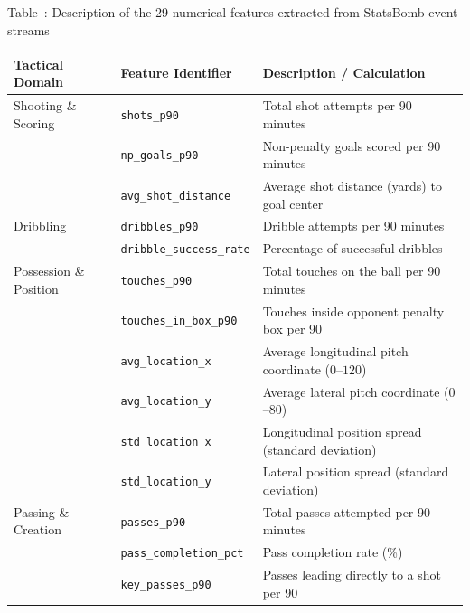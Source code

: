 \documentclass[12pt]{ai_conquer2026}
\begin{document}
\begin{table}[H]
\centering
\begin{minipage}{1.0\linewidth}
  \begin{captionbelowboxaivn}
    Table~\thetable: Description of the 29 numerical features extracted from StatsBomb event streams
    \label{tab:features}
  \end{captionbelowboxaivn}
  \renewcommand{\arraystretch}{1.2}
  \begin{tabularx}{\linewidth}{@{}>{\raggedright\arraybackslash}p{3.5cm} >{\raggedright\arraybackslash}p{5.5cm} >{\raggedright\arraybackslash}X@{}}
    \toprule
    \textbf{Tactical Domain} & \textbf{Feature Identifier} & \textbf{Description / Calculation} \\
    \midrule
    Shooting \& Scoring & \texttt{shots\_p90} & Total shot attempts per 90 minutes \\
     & \texttt{np\_goals\_p90} & Non-penalty goals scored per 90 minutes \\
     & \texttt{avg\_shot\_distance} & Average shot distance (yards) to goal center \\
    \midrule
    Dribbling & \texttt{dribbles\_p90} & Dribble attempts per 90 minutes \\
     & \texttt{dribble\_\allowbreak success\_\allowbreak rate} & Percentage of successful dribbles \\
    \midrule
    Possession \& Position & \texttt{touches\_p90} & Total touches on the ball per 90 minutes \\
     & \texttt{touches\_in\_box\_p90} & Touches inside opponent penalty box per 90 \\
     & \texttt{avg\_location\_x} & Average longitudinal pitch coordinate ($0$--$120$) \\
     & \texttt{avg\_location\_y} & Average lateral pitch coordinate ($0$--$80$) \\
     & \texttt{std\_location\_x} & Longitudinal position spread (standard deviation) \\
     & \texttt{std\_location\_y} & Lateral position spread (standard deviation) \\
    \midrule
    Passing \& Creation & \texttt{passes\_p90} & Total passes attempted per 90 minutes \\
     & \texttt{pass\_completion\_pct} & Pass completion rate (\%) \\
     & \texttt{key\_passes\_p90} & Passes leading directly to a shot per 90 \\

\end{tabularx}
\end{minipage}
\end{table}
\end{document}
